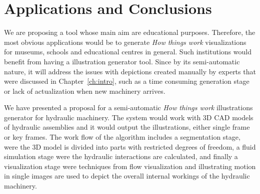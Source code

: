 \chapter{Applications and Conclusions}

We are proposing a tool whose main aim are educational purposes.
Therefore, the most obvious applications would be to generate \textit{How things work} visualizations for museums, schools and educational centres in general.
Such institutions would benefit from having a illustration generator tool.
Since by its semi-automatic nature, it will address the issues with depictions created manually by experts that were discussed in Chapter~\ref{ch:intro}, such as a time consuming generation stage or lack of actualization when new machinery arrives.

We have presented a proposal for a semi-automatic \textit{How things work} illustrations generator for hydraulic machinery.
The system would work with 3D CAD models of hydraulic assemblies and it would output the illustrations, either single frame or key frames.
The work flow of the algorithm includes a segmentation stage, were the 3D model is divided into parts with restricted degrees of freedom, a fluid simulation stage were the hydraulic interactions are calculated, and finally a visualization stage were techniques from flow visualization and illustrating motion in single images are used to depict the overall internal workings of the hydraulic machinery.